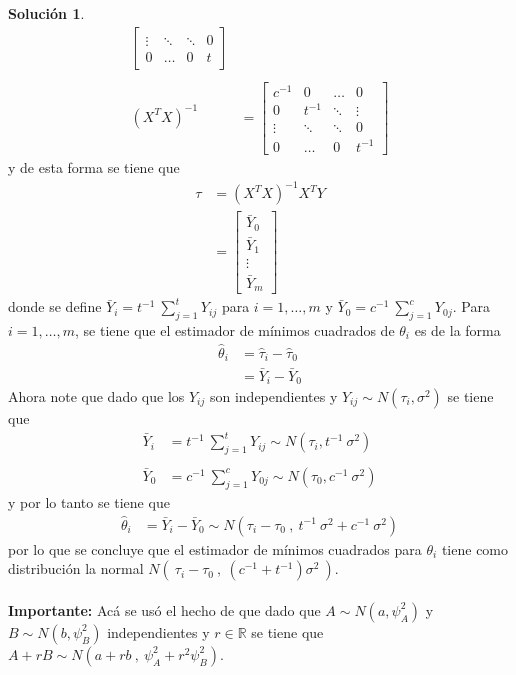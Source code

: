 \documentclass[12pt]{article}
\theoremstyle{plain}
\theoremstyle{definition}
\theoremstyle{definition}
\theoremstyle{definition}
\newtheorem*{solution}{Solución}
\newcommand{\R}{\mathbb{R}}
\begin{document}
\begin{solution}
\begin{align*}
\begin{bmatrix}
        \vdots & \ddots & \ddots & 0 \\
        0 & \ldots & 0 & t
    \end{bmatrix} \\ \\
    (X^T X)^{-1} &= \begin{bmatrix}
        c^{-1} & 0 & \ldots & 0 \\
        0 & t^{-1} & \ddots & \vdots \\
        \vdots & \ddots & \ddots & 0 \\
        0 & \ldots & 0 & t^{-1}
    \end{bmatrix}
\end{align*}
y de esta forma se tiene que 
\begin{align*}
    \tau &= (X^T X)^{-1} X^T Y  \\
         &= \begin{bmatrix}
             \bar{Y}_0 \\ \bar{Y}_1 \\ \vdots \\ \bar{Y}_m
             \end{bmatrix}
\end{align*}
donde se define $\bar{Y}_i =  t^{-1} \ \sum_{j=1}^{t} Y_{ij}$ para $i = 1,\ldots,m$ y $\bar{Y}_0 = c^{-1}\ \sum_{j=1}^{c} Y_{0j}$. Para $i=1,\ldots,m$, se tiene que el estimador de mínimos cuadrados de $\theta_i$ es de la forma
\begin{align*}
 \hat{\theta}_i &= \hat{\tau}_i - \hat{\tau}_0 \\
                &= \bar{Y}_i - \bar{Y}_0
\end{align*}
Ahora note que dado que los $Y_{ij}$ son independientes y $Y_{ij} \sim N(\tau_i, \sigma^2)$ se tiene que
\begin{align*}
    \bar{Y}_i  &= t^{-1}\ \sum_{j=1}^{t} Y_{ij} \sim N(\tau_i, t^{-1} \ \sigma^2)  \\ \\
    \bar{Y}_0 &= c^{-1}\ \sum_{j=1}^{c} Y_{0j} \sim N(\tau_0, c^{-1} \ \sigma^2)
\end{align*}
y por lo tanto se tiene que 
\begin{align*}
    \hat{\theta}_i &=  \bar{Y}_i - \bar{Y}_0 \sim N(\tau_i - \tau_0 \ , \ t^{-1} \ \sigma^2 + c^{-1} \ \sigma^2)
\end{align*}
por lo que se concluye que el estimador de mínimos cuadrados para $\theta_i$ tiene como distribución la normal $N(\ \tau_i-\tau_0\ ,\  (c^{-1}+t^{-1})\sigma^2 \ )$. \\
\\
\textbf{Importante:} Acá se usó el hecho de que dado que $A \sim N(a,\psi_A^2)$ y $B \sim N(b,\psi_B^2)$  independientes y $r \in \R$ se tiene que $A + rB \sim N(a+rb \ ,\  \psi_A^2 + r^2 \psi_B^2 )$. 
\end{solution}
\end{document}
